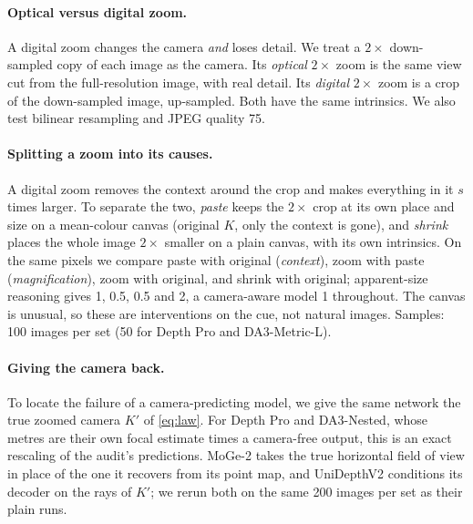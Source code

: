 \paragraph{Optical versus digital zoom.}
A digital zoom changes the camera \emph{and} loses detail. We treat a $2\times$ down-sampled copy of each image
as the camera. Its \emph{optical} $2\times$ zoom is the same view cut from the full-resolution image, with real
detail. Its \emph{digital} $2\times$ zoom is a crop of the down-sampled image, up-sampled. Both have the same
intrinsics. We also test bilinear resampling and JPEG quality 75.

\paragraph{Splitting a zoom into its causes.}
\label{sec:cues}
A digital zoom removes the context around the crop and makes everything in it $s$ times larger. To separate
the two, \emph{paste} keeps the $2\times$ crop at its own place and size on a mean-colour canvas (original $K$,
only the context is gone), and \emph{shrink} places the whole image $2\times$ smaller on a plain canvas, with its
own intrinsics. On the same pixels we compare paste with original (\emph{context}), zoom with paste
(\emph{magnification}), zoom with original, and shrink with original; apparent-size reasoning gives 1, 0.5, 0.5
and 2, a camera-aware model 1 throughout. The canvas is unusual, so these are interventions on the cue, not
natural images. Samples: 100 images per set (50 for Depth Pro and DA3-Metric-L).

\paragraph{Giving the camera back.}
\label{sec:camint}
To locate the failure of a camera-predicting model, we give the same network the true zoomed camera $K'$ of
\cref{eq:law}. For Depth Pro and DA3-Nested, whose metres are their own focal estimate times a camera-free
output, this is an exact rescaling of the audit's predictions. MoGe-2 takes the true horizontal field of view in
place of the one it recovers from its point map, and UniDepthV2 conditions its decoder on the rays of $K'$; we
rerun both on the same 200 images per set as their plain runs.

